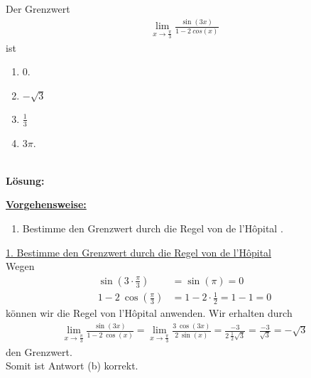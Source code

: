 \subsection*{}
Der Grenzwert 
\begin{align*}
\lim \limits_{x \rightarrow \frac{\pi}{3}}
\frac{\sin(3x)}{1 - 2 \ cos(x)}
\end{align*}
ist
\renewcommand{\labelenumi}{(\alph{enumi})}
\begin{enumerate}
\item $0$.
\item $- \sqrt{3}$
\item $\frac{1}{3}$
\item $3 \pi$.
\end{enumerate}
\ \\
\textbf{Lösung:}
\begin{mdframed}
\underline{\textbf{Vorgehensweise:}}
\renewcommand{\labelenumi}{\theenumi.}
\begin{enumerate}
\item Bestimme den Grenzwert durch die Regel von de l'H\^{o}pital .
\end{enumerate}
\end{mdframed}

\underline{1. Bestimme den Grenzwert durch die Regel von de l'H\^{o}pital }\\
Wegen
\begin{align*}
\sin \left(3 \cdot \frac{\pi}{3} \right) &= \sin(\pi) = 0\\
1 - 2 \ \cos \left( \frac{\pi}{3} \right)
&= 1 - 2 \cdot \frac{1}{2}
= 1- 1 = 0 
\end{align*}
können wir die Regel von l'H\^{o}pital anwenden.
Wir erhalten durch
\begin{align*}
\lim \limits_{x \rightarrow \frac{\pi}{3}}
\frac{\sin(3x)}{1 - 2 \ \cos(x)}
= \lim \limits_{x \rightarrow \frac{\pi}{3}}
\frac{3 \ \cos(3x)}{ 2 \ \sin(x)}
= 
\frac{-3 }{ 2 \ \frac{1}{2} \sqrt{3}}
= \frac{-3}{\sqrt{3}}
= - \sqrt{3}
\end{align*}
den Grenzwert.
\\
Somit ist Antwort (b) korrekt.
\newpage

